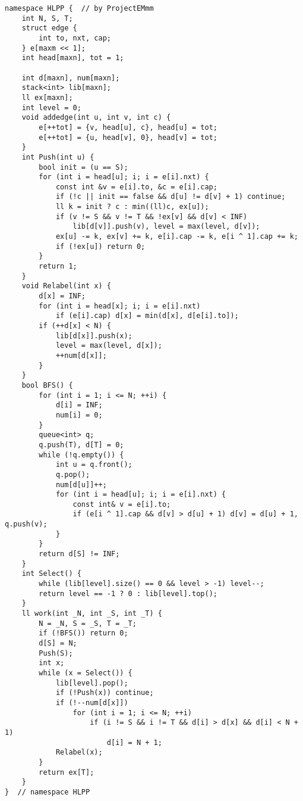\documentclass[twoside]{article}
\begin{document}
\begin{lstlisting}
namespace HLPP {  // by ProjectEMmm
	int N, S, T;
	struct edge {
		int to, nxt, cap;
	} e[maxm << 1];
	int head[maxn], tot = 1;

	int d[maxn], num[maxn];
	stack<int> lib[maxn];
	ll ex[maxn];
	int level = 0;
	void addedge(int u, int v, int c) {
		e[++tot] = {v, head[u], c}, head[u] = tot;
		e[++tot] = {u, head[v], 0}, head[v] = tot;
	}
	int Push(int u) {
		bool init = (u == S);
		for (int i = head[u]; i; i = e[i].nxt) {
			const int &v = e[i].to, &c = e[i].cap;
			if (!c || init == false && d[u] != d[v] + 1) continue;
			ll k = init ? c : min((ll)c, ex[u]);
			if (v != S && v != T && !ex[v] && d[v] < INF)
				lib[d[v]].push(v), level = max(level, d[v]);
			ex[u] -= k, ex[v] += k, e[i].cap -= k, e[i ^ 1].cap += k;
			if (!ex[u]) return 0;
		}
		return 1;
	}
	void Relabel(int x) {
		d[x] = INF;
		for (int i = head[x]; i; i = e[i].nxt)
			if (e[i].cap) d[x] = min(d[x], d[e[i].to]);
		if (++d[x] < N) {
			lib[d[x]].push(x);
			level = max(level, d[x]);
			++num[d[x]];
		}
	}
	bool BFS() {
		for (int i = 1; i <= N; ++i) {
			d[i] = INF;
			num[i] = 0;
		}
		queue<int> q;
		q.push(T), d[T] = 0;
		while (!q.empty()) {
			int u = q.front();
			q.pop();
			num[d[u]]++;
			for (int i = head[u]; i; i = e[i].nxt) {
				const int& v = e[i].to;
				if (e[i ^ 1].cap && d[v] > d[u] + 1) d[v] = d[u] + 1, q.push(v);
			}
		}
		return d[S] != INF;
	}
	int Select() {
		while (lib[level].size() == 0 && level > -1) level--;
		return level == -1 ? 0 : lib[level].top();
	}
	ll work(int _N, int _S, int _T) {
		N = _N, S = _S, T = _T;
		if (!BFS()) return 0;
		d[S] = N;
		Push(S);
		int x;
		while (x = Select()) {
			lib[level].pop();
			if (!Push(x)) continue;
			if (!--num[d[x]])
				for (int i = 1; i <= N; ++i)
					if (i != S && i != T && d[i] > d[x] && d[i] < N + 1)
						d[i] = N + 1;
			Relabel(x);
		}
		return ex[T];
	}
}  // namespace HLPP\end{lstlisting}
\end{document}
